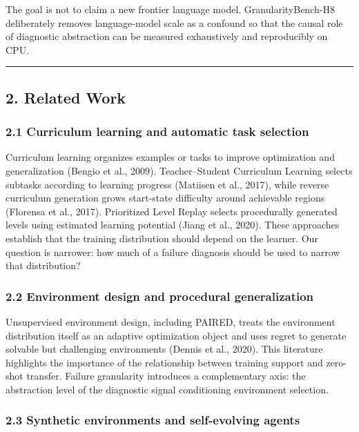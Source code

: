 \documentclass[
]{article}
\begin{document}
The goal is not to claim a new frontier language model.
GranularityBench-H8 deliberately removes language-model scale as a
confound so that the causal role of diagnostic abstraction can be
measured exhaustively and reproducibly on CPU.

\begin{center}\rule{0.5\linewidth}{0.5pt}\end{center}

\subsection{2. Related Work}\label{related-work}

\subsubsection{2.1 Curriculum learning and automatic task
selection}\label{curriculum-learning-and-automatic-task-selection}

Curriculum learning organizes examples or tasks to improve optimization
and generalization (Bengio et al., 2009). Teacher--Student Curriculum
Learning selects subtasks according to learning progress (Matiisen et
al., 2017), while reverse curriculum generation grows start-state
difficulty around achievable regions (Florensa et al., 2017).
Prioritized Level Replay selects procedurally generated levels using
estimated learning potential (Jiang et al., 2020). These approaches
establish that the training distribution should depend on the learner.
Our question is narrower: how much of a failure diagnosis should be used
to narrow that distribution?

\subsubsection{2.2 Environment design and procedural
generalization}\label{environment-design-and-procedural-generalization}

Unsupervised environment design, including PAIRED, treats the
environment distribution itself as an adaptive optimization object and
uses regret to generate solvable but challenging environments (Dennis et
al., 2020). This literature highlights the importance of the
relationship between training support and zero-shot transfer. Failure
granularity introduces a complementary axis: the abstraction level of
the diagnostic signal conditioning environment selection.

\subsubsection{2.3 Synthetic environments and self-evolving
agents}\label{synthetic-environments-and-self-evolving-agents}
\end{document}
